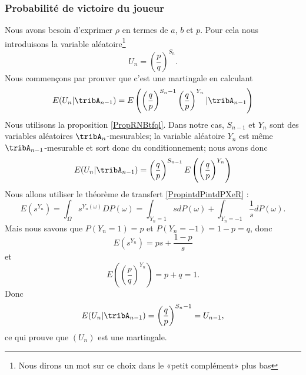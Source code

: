\subsubsection{Probabilité de victoire du joueur}

Nous avons besoin d'exprimer \( \rho\) en termes de \( a\), \( b\) et \( p\). Pour cela nous introduisons la variable aléatoire\footnote{Nous dirons un mot sur ce choix dans le «petit complément» plus bas}
\begin{equation}    \label{EqFUsSnit}
    U_n=\left( \frac{ p }{ q } \right)^{S_n}.
\end{equation}
Nous commençons par prouver que c'est une martingale en calculant
\begin{equation}
    E(U_n|\tribA_{n-1})=E\left( \left( \frac{ q }{ p } \right)^{S_n-1}\left( \frac{ q }{ p } \right)^{Y_n}|\tribA_{n-1} \right)
\end{equation}
Nous utilisons la proposition \ref{PropRNBtfql}. Dans notre cas, \( S_{n-1}\) et \( Y_n\) sont des variables aléatoires \( \tribA_n\)-mesurables; la variable aléatoire \( Y_n\) est même \( \tribA_{n-1}\)-mesurable et sort donc du conditionnement; nous avons donc
\begin{equation}    \label{EqWTkXcEK}
    E(U_n|\tribA_{n-1})=\left( \frac{ q }{ p } \right)^{S_{n-1}}E\left( \left( \frac{ q }{ p } \right)^{Y_n} \right)
\end{equation}
Nous allons utiliser le théorème de transfert \ref{PropintdPintdPXeR} : 
\begin{equation}
    E(s^{Y_n})=\int_{\Omega}s^{Y_n(\omega)}DP(\omega)=\int_{Y_n=1}sdP(\omega)+\int_{Y_n=-1}\frac{1}{ s }dP(\omega).
\end{equation}
Mais nous savons que \( P(Y_n=1)=p\) et \( P(Y_n=-1)=1-p=q\), donc
\begin{equation}
    E(s^{Y_n})=ps+\frac{ 1-p }{ s }
\end{equation}
et
\begin{equation}
    E\left( \left( \frac{ p }{ q } \right)^{Y_n} \right)=p+q=1.
\end{equation}
Donc
\begin{equation}
    E(U_n|\tribA_{n-1})=\left( \frac{ q }{ p } \right)^{S_n-1}=U_{n-1},
\end{equation}
ce qui prouve que \( (U_n)\) est une martingale.

